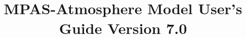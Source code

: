\documentclass[11pt]{report}
\newcommand{\version}{7.0}
\begin{document}
\title{\bf \hfil MPAS-Atmosphere Model User's Guide \hfil \break \hfil \break Version \version}


\maketitle



\tableofcontents











\appendix






\end{document}

